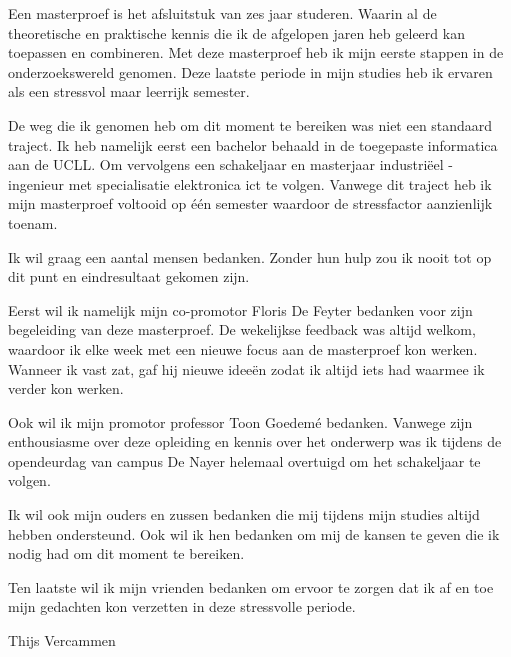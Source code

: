 Een masterproef is het afsluitstuk van zes jaar studeren.
Waarin al de theoretische en praktische kennis die ik de afgelopen jaren heb geleerd kan toepassen en combineren.
Met deze masterproef heb ik mijn eerste stappen in de onderzoekswereld genomen.
Deze laatste periode in mijn studies heb ik ervaren als een stressvol maar leerrijk semester.

De weg die ik genomen heb om dit moment te bereiken was niet een standaard traject.
Ik heb namelijk eerst een bachelor behaald in de toegepaste informatica aan de UCLL.
Om vervolgens een schakeljaar en masterjaar industri\"eel - ingenieur met specialisatie elektronica ict te volgen.
Vanwege dit traject heb ik mijn masterproef voltooid op \'e\'en semester waardoor de stressfactor aanzienlijk toenam.

Ik wil graag een aantal mensen bedanken.
Zonder hun hulp zou ik nooit tot op dit punt en eindresultaat gekomen zijn.

Eerst wil ik namelijk mijn co-promotor Floris De Feyter bedanken voor zijn begeleiding van deze masterproef.
De wekelijkse feedback was altijd welkom, waardoor ik elke week met een nieuwe focus aan de masterproef kon werken.
Wanneer ik vast zat, gaf hij nieuwe idee\"en zodat ik altijd iets had waarmee ik verder kon werken.

Ook wil ik mijn promotor professor Toon Goedem\'e bedanken.
Vanwege zijn enthousiasme over deze opleiding en kennis over het onderwerp was ik tijdens de opendeurdag van campus De Nayer helemaal overtuigd om het schakeljaar te volgen.

Ik wil ook mijn ouders en zussen bedanken die mij tijdens mijn studies altijd hebben ondersteund. 
Ook wil ik hen bedanken om mij de kansen te geven die ik nodig had om dit moment te bereiken.

Ten laatste wil ik mijn vrienden bedanken om ervoor te zorgen dat ik af en toe mijn gedachten kon verzetten in deze stressvolle periode.

Thijs Vercammen